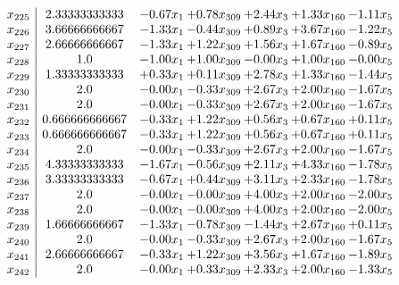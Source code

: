 \documentclass[8pt]{article}
\begin{document}
\[\begin{array}{c| c c@{\hskip 2pt} c@{\hskip 2pt} c@{\hskip 2pt} c@{\hskip 2pt} c@{\hskip 2pt} }
 x_{225}   &  2.33333333333 & -0.67 x_{1} & +  0.78 x_{309} & +  2.44 x_{3} & +  1.33 x_{160} & -1.11 x_{5}\\
 x_{226}   &  3.66666666667 & -1.33 x_{1} & -0.44 x_{309} & +  0.89 x_{3} & +  3.67 x_{160} & -1.22 x_{5}\\
 x_{227}   &  2.66666666667 & -1.33 x_{1} & +  1.22 x_{309} & +  1.56 x_{3} & +  1.67 x_{160} & -0.89 x_{5}\\
 x_{228}   &  1.0 & -1.00 x_{1} & +  1.00 x_{309} & -0.00 x_{3} & +  1.00 x_{160} & -0.00 x_{5}\\
 x_{229}   &  1.33333333333 & +  0.33 x_{1} & +  0.11 x_{309} & +  2.78 x_{3} & +  1.33 x_{160} & -1.44 x_{5}\\
 x_{230}   &  2.0 & -0.00 x_{1} & -0.33 x_{309} & +  2.67 x_{3} & +  2.00 x_{160} & -1.67 x_{5}\\
 x_{231}   &  2.0 & -0.00 x_{1} & -0.33 x_{309} & +  2.67 x_{3} & +  2.00 x_{160} & -1.67 x_{5}\\
 x_{232}   &  0.666666666667 & -0.33 x_{1} & +  1.22 x_{309} & +  0.56 x_{3} & +  0.67 x_{160} & +  0.11 x_{5}\\
 x_{233}   &  0.666666666667 & -0.33 x_{1} & +  1.22 x_{309} & +  0.56 x_{3} & +  0.67 x_{160} & +  0.11 x_{5}\\
 x_{234}   &  2.0 & -0.00 x_{1} & -0.33 x_{309} & +  2.67 x_{3} & +  2.00 x_{160} & -1.67 x_{5}\\
 x_{235}   &  4.33333333333 & -1.67 x_{1} & -0.56 x_{309} & +  2.11 x_{3} & +  4.33 x_{160} & -1.78 x_{5}\\
 x_{236}   &  3.33333333333 & -0.67 x_{1} & +  0.44 x_{309} & +  3.11 x_{3} & +  2.33 x_{160} & -1.78 x_{5}\\
 x_{237}   &  2.0 & -0.00 x_{1} & -0.00 x_{309} & +  4.00 x_{3} & +  2.00 x_{160} & -2.00 x_{5}\\
 x_{238}   &  2.0 & -0.00 x_{1} & -0.00 x_{309} & +  4.00 x_{3} & +  2.00 x_{160} & -2.00 x_{5}\\
 x_{239}   &  1.66666666667 & -1.33 x_{1} & -0.78 x_{309} & -1.44 x_{3} & +  2.67 x_{160} & +  0.11 x_{5}\\
 x_{240}   &  2.0 & -0.00 x_{1} & -0.33 x_{309} & +  2.67 x_{3} & +  2.00 x_{160} & -1.67 x_{5}\\
 x_{241}   &  2.66666666667 & -0.33 x_{1} & +  1.22 x_{309} & +  3.56 x_{3} & +  1.67 x_{160} & -1.89 x_{5}\\
 x_{242}   &  2.0 & -0.00 x_{1} & +  0.33 x_{309} & +  2.33 x_{3} & +  2.00 x_{160} & -1.33 x_{5}\\

\end{array}\]
\end{document}
